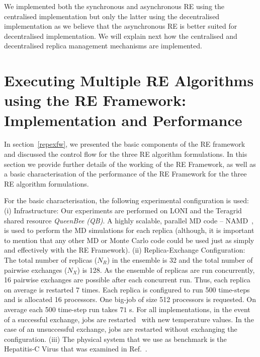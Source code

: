 \documentclass{rspublic}
\newcommand{\jhanote}[1]{ {\textcolor{red} { ***shantenu: #1 }}}
\newcommand{\alnote}[1]{ {\textcolor{blue} { ***andre: #1 }}}
\newcommand{\athotanote}[1]{ {\textcolor{green} { ***athota: #1 }}}
\newcommand{\alnote}[1]{}
\newcommand{\athotanote}[1]{}
\newcommand{\jhanote}[1]{}
\begin{document}

We implemented both the synchronous and asynchronous RE using the
centralised implementation but only the latter using the decentralised
implementation as we believe that the asynchronous RE is better suited
for decentralised implementation. We will explain next how the
centralised and decentralised replica management mechanisms are
implemented.



\section{Executing Multiple RE Algorithms using the RE Framework: Implementation and Performance}
\label{sec:re_impl}

In section~\ref{repexfw}, we presented the basic components of the RE
framework and discussed the control flow for the three RE algorithm
formulations.  In this section we provide further details of the
working of the RE Framework, as well as a basic characterisation of
the performance of the RE Framework for the three RE algorithm
formulations.


For the basic characterisation, the following experimental
configuration is used: (i) Infrastructure: Our experiments are
performed on LONI and the Teragrid shared resource \emph{QueenBee (QB)}. A
highly scalable, parallel MD code -- NAMD~\citep{Phillips:2005gd}, is
used to perform the MD simulations for each replica (although, it
is important to mention that any other MD or Monte Carlo code could be
used just as simply and effectively with the RE Framework).  (ii)
Replica-Exchange Configuration: The total number of replicas ($N_R$)
in the ensemble is 32 and the total number of pairwise exchanges
($N_X$) is 128. As the ensemble of replicas are run concurrently, 16
pairwise exchanges are possible after each concurrent run. Thus, each
replica on average is restarted 7 times.  Each replica is configured
to run 500 time-steps and is allocated 16 processors. One big-job of
size 512 processors is requested. On average each 500 time-step run
takes $71$ s.  For all implementations, in the event of a
successful exchange, jobs are restarted~\citep{Luckow:2008fp} with new
temperature values.  In the case of an unsuccessful exchange, jobs are
restarted without exchanging the configuration.  (iii) The physical
system that we use as benchmark is the Hepatitis-C Virus that was
examined in Ref.~\cite{Luckow:2008fp}.
\end{document}
